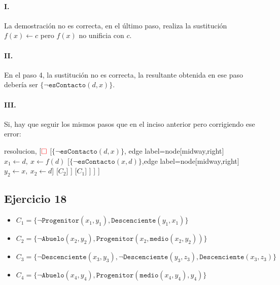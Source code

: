\documentclass[10pt,a4paper]{article}
\begin{document}
\paragraph{I.} La demostración no es correcta, en el último paso, realiza la sustitución $f(x)\leftarrow c$ pero $f(x)$ no unificia con $c$.

\paragraph{II.} En el paso 4, la sustitución no es correcta, la resultante obtenida en ese paso debería ser $\{\lnot\texttt{esContacto}(d,x)\}$.

\paragraph{III.} Si, hay que seguir los mismos pasos que en el inciso anterior pero corrigiendo ese error:

\begin{center}
	\begin{forest} resolucion,
[${\color{red}\Box}$ 
                	[$\{\lnot\texttt{esContacto}(d \comma x)\}$, edge label={node[midway,right] {$x_1\leftarrow d,~x\leftarrow f(d)$}}
                    	[$\{\lnot \texttt{esContacto}(x\comma d)\}$,edge label={node[midway,right] {$y_2\leftarrow x,~x_2\leftarrow d$}}]
                    	[$C_2$]
                	]
                	[$C_1$]
            	]
        	]
]
	\end{forest}
\end{center}

\subsection{Ejercicio 18}
    \begin{itemize}
        \item $C_1 = \{ \lnot \texttt{Progenitor}(x_1,y_1),\texttt{Descenciente}(y_1,x_1)\}$ 
         \item $C_2 =\{ \lnot \texttt{Abuelo}(x_2,y_2), \texttt{Progenitor}(x_2, \texttt{medio}(x_2,y_2))\}$ 
        \item $C_3 = \{ \lnot \texttt{Descenciente}(x_3,y_3), \lnot \texttt{Descenciente}(y_3,z_3), \texttt{Descenciente}(x_3,z_3)\}$ 
        \item $C_4 =\{ \lnot \texttt{Abuelo}(x_4,y_4), \texttt{Progenitor}(\texttt{medio}(x_4,y_4),y_4)\}$ 
     \end{itemize}
\end{document}
